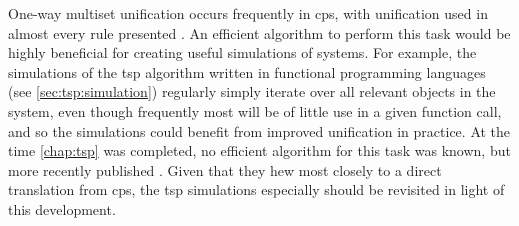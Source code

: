 One-way multiset unification occurs frequently in \gls{cps}, with unification used in almost every rule presented .  An efficient algorithm to perform this task would be highly beneficial for creating useful simulations of systems.  For example, the simulations of the \gls{tsp} algorithm written in functional programming languages (see \vref{sec:tsp:simulation}) regularly simply iterate over all relevant objects in the system, even though frequently most will be of little use in a given function call, and so the simulations could benefit from improved unification in practice.  At the time \cref{chap:tsp} was completed, no efficient algorithm for this task was known, but more recently \citeauthor{Liu2021} published  \cite{Liu2021}.  Given that they hew most closely to a direct translation from \gls{cps}, the \gls{tsp} simulations especially should be revisited in light of this development.







